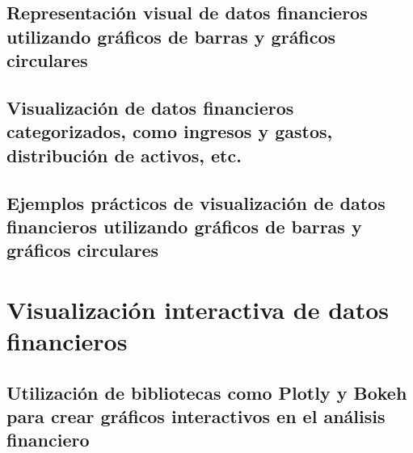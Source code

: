 \documentclass[
  a4paper,
]{article}
\begin{document}
\hypertarget{representaciuxf3n-visual-de-datos-financieros-utilizando-gruxe1ficos-de-barras-y-gruxe1ficos-circulares}{%
\subsection{Representación visual de datos financieros utilizando
gráficos de barras y gráficos
circulares}\label{representaciuxf3n-visual-de-datos-financieros-utilizando-gruxe1ficos-de-barras-y-gruxe1ficos-circulares}}

\hypertarget{visualizaciuxf3n-de-datos-financieros-categorizados-como-ingresos-y-gastos-distribuciuxf3n-de-activos-etc.}{%
\subsection{Visualización de datos financieros categorizados, como
ingresos y gastos, distribución de activos,
etc.}\label{visualizaciuxf3n-de-datos-financieros-categorizados-como-ingresos-y-gastos-distribuciuxf3n-de-activos-etc.}}

\hypertarget{ejemplos-pruxe1cticos-de-visualizaciuxf3n-de-datos-financieros-utilizando-gruxe1ficos-de-barras-y-gruxe1ficos-circulares}{%
\subsection{Ejemplos prácticos de visualización de datos financieros
utilizando gráficos de barras y gráficos
circulares}\label{ejemplos-pruxe1cticos-de-visualizaciuxf3n-de-datos-financieros-utilizando-gruxe1ficos-de-barras-y-gruxe1ficos-circulares}}

\hypertarget{visualizaciuxf3n-interactiva-de-datos-financieros}{%
\section{Visualización interactiva de datos
financieros}\label{visualizaciuxf3n-interactiva-de-datos-financieros}}

\hypertarget{utilizaciuxf3n-de-bibliotecas-como-plotly-y-bokeh-para-crear-gruxe1ficos-interactivos-en-el-anuxe1lisis-financiero}{%
\subsection{Utilización de bibliotecas como Plotly y Bokeh para crear
gráficos interactivos en el análisis
financiero}\label{utilizaciuxf3n-de-bibliotecas-como-plotly-y-bokeh-para-crear-gruxe1ficos-interactivos-en-el-anuxe1lisis-financiero}}
\end{document}
